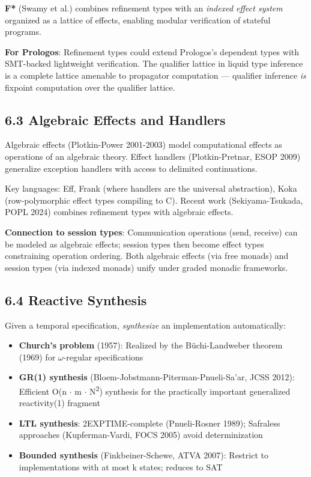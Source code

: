 \documentclass[11pt]{article}
\begin{document}
\textbf{F*} (Swamy et al.) combines refinement types with an \emph{indexed effect system}
organized as a lattice of effects, enabling modular verification of stateful
programs.

\textbf{For Prologos}: Refinement types could extend Prologos's dependent types with
SMT-backed lightweight verification. The qualifier lattice in liquid type
inference is a complete lattice amenable to propagator computation ---
qualifier inference \emph{is} fixpoint computation over the qualifier lattice.
\subsection{6.3 Algebraic Effects and Handlers}
\label{sec:orge5949ad}

Algebraic effects (Plotkin-Power 2001-2003) model computational effects as
operations of an algebraic theory. Effect handlers (Plotkin-Pretnar, ESOP 2009)
generalize exception handlers with access to delimited continuations.

Key languages: Eff, Frank (where handlers are the universal abstraction), Koka
(row-polymorphic effect types compiling to C). Recent work (Sekiyama-Tsukada,
POPL 2024) combines refinement types with algebraic effects.

\textbf{Connection to session types}: Communication operations (send, receive) can be
modeled as algebraic effects; session types then become effect types constraining
operation ordering. Both algebraic effects (via free monads) and session types
(via indexed monads) unify under graded monadic frameworks.
\subsection{6.4 Reactive Synthesis}
\label{sec:orge444803}

Given a temporal specification, \emph{synthesize} an implementation automatically:

\begin{itemize}
\item \textbf{Church's problem} (1957): Realized by the Büchi-Landweber theorem (1969)
for \(\omega\)-regular specifications
\item \textbf{GR(1) synthesis} (Bloem-Jobstmann-Piterman-Pnueli-Sa'ar, JCSS 2012):
Efficient O(n \(\cdot\) m \(\cdot\) N\textsuperscript{2}) synthesis for the practically important
generalized reactivity(1) fragment
\item \textbf{LTL synthesis}: 2EXPTIME-complete (Pnueli-Rosner 1989); Safraless
approaches (Kupferman-Vardi, FOCS 2005) avoid determinization
\item \textbf{Bounded synthesis} (Finkbeiner-Schewe, ATVA 2007): Restrict to
implementations with at most k states; reduces to SAT
\end{itemize}
\end{document}
